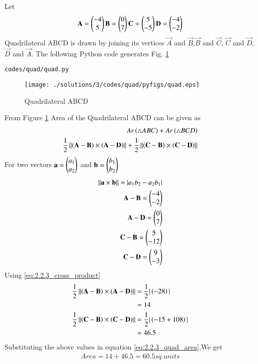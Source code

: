 Let
\begin{align}
\mathbf{A}=\begin{pmatrix}-4\\5\end{pmatrix}
\mathbf{B}=\begin{pmatrix}0\\7\end{pmatrix}
\mathbf{C}=\begin{pmatrix}5\\-5\end{pmatrix}
\mathbf{D}=\begin{pmatrix}-4\\-2\end{pmatrix}
\end{align}
Quadrilateral ABCD is drawn by joining its vertices $\vec{A}$ and $\vec{B}$,$\vec{B}$ and $\vec{C}$, $\vec{C}$ and $\vec{D}$, $\vec{D}$ and $\vec{A}$.
 The  following Python code generates Fig. \ref{fig:2.2.3_quad_py}
%
\begin{lstlisting}
codes/quad/quad.py
\end{lstlisting}
\begin{figure}[!ht]
\centering
\texttt{[image: ./solutions/3/codes/quad/pyfigs/quad.eps]}
\caption{Quadrilateral ABCD}
\label{fig:2.2.3_quad_py}
\end{figure}

 From Figure \ref{fig:2.2.3_quad_py} Area of the Quadrilateral ABCD can be given as
\begin{align}
Ar\left(\triangle ABC\right) + Ar\left(\triangle BCD\right)
\\
\frac{1}{2} \left\lVert\left(\mathbf{A}-\mathbf{B}\right)\times \left(\mathbf{A}-\mathbf{D}\right)\right\rVert + \frac{1}{2} \left\lVert{\ensuremath{\left(\mathbf{C}-\mathbf{B}\right)}} \times{\ensuremath{\left(\mathbf{C}-\mathbf{D}\right)}}\right\rVert
\label{eq:2.2.3_quad_area}
\end{align}
For two vectors $\mathbf{a} = \begin{pmatrix}a_1\\a_2\end{pmatrix}$ and $\mathbf{b} = \begin{pmatrix}b_1\\b_2\end{pmatrix}$
\begin{align}
\label{eq:2.2.3_cross_product}
\left\lVert\mathbf{a} \times \mathbf{b}\right\rVert = |a_1 b_2- a_2 b_1|
\\
\mathbf{A}-\mathbf{B} = \begin{pmatrix}-4\\-2\end{pmatrix}
\\
\mathbf{A}-\mathbf{D} = \begin{pmatrix}0\\7\end{pmatrix}
\\
\mathbf{C}-\mathbf{B} = \begin{pmatrix}5\\-12\end{pmatrix}
\\
\mathbf{C}-\mathbf{D} = \begin{pmatrix}9\\-3\end{pmatrix}
\end{align}
Using \eqref{eq:2.2.3_cross_product}
\begin{align}
\frac{1}{2} \left\lVert\left(\mathbf{A}-\mathbf{B}\right)\times \left(\mathbf{A}-\mathbf{D}\right)\right\rVert &= \frac{1}{2} |\left(-28\right)| 
\\
&=14
\\
\frac{1}{2} \left\lVert\left(\mathbf{C}-\mathbf{B}\right) \times \left(\mathbf{C}-\mathbf{D}\right)\right\rVert &= \frac{1}{2} |\left(-15+108\right)|
\\
&=46.5
\end{align}
Substituting the above values in equation \eqref{eq:2.2.3_quad_area},We get
\begin{align}
Area = 14 + 46.5 = 60.5 sq.units
\end{align}
